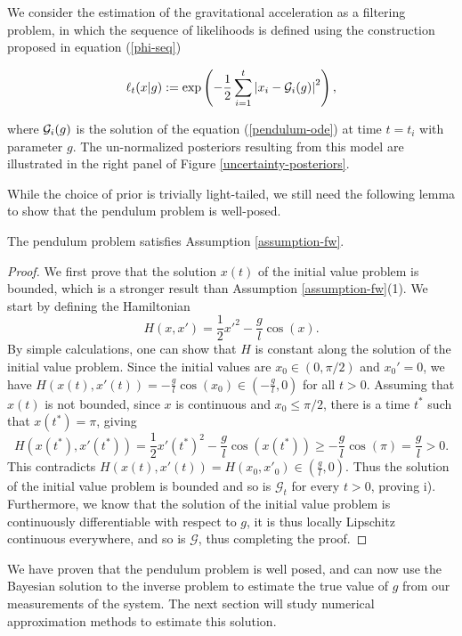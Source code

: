 We consider the estimation of the gravitational acceleration as a filtering problem, in which the sequence of likelihoods is defined using the construction proposed in equation (\ref{phi-seq})

\begin{equation}\label{pendulum-weights}
  \ell_t(x|g) := \exp\left(-\frac12\sum_{i=1}^t\left|x_i - \mathcal{G}_i(g)\right|^2\right),
\end{equation}

where $\mathcal{G}_i(g)$ is the solution of the equation (\ref{pendulum-ode}) at time $t = t_i$ with parameter $g$. The un-normalized posteriors resulting from this model are illustrated in the right panel of Figure \ref{uncertainty-posteriors}.

While the choice of prior is trivially light-tailed, we still need the following lemma to show that the pendulum problem is well-posed.

\begin{lemma} The pendulum problem satisfies Assumption \ref{assumption-fw}.
\end{lemma}

\begin{proof}
  We first prove that the solution $x(t)$ of the initial value problem is bounded, which is a stronger result than Assumption \ref{assumption-fw}(1). We start by defining the Hamiltonian
  \begin{equation*}
    H(x, x') = \frac12 x'^2 - \frac{g}{l}\cos(x).
  \end{equation*}
  By simple calculations, one can show that $H$ is constant along the solution of the initial value problem. Since the initial values are $x_0 \in (0, \pi/2)$ and $x_0' = 0$, we have $H(x(t), x'(t)) = -\frac{g}{l}\cos(x_0) \in (-\frac{g}{l}, 0)$ for all $t > 0$. Assuming that $x(t)$ is not bounded, since $x$ is continuous and $x_0 \le \pi/2$, there is a time $t^*$ such that $x(t^*) = \pi$, giving
  \begin{equation*}
    H(x(t^*), x'(t^*)) = \frac12 x'(t^*)^2 - \frac{g}{l}\cos(x(t^*)) \ge -\frac{g}{l}\cos(\pi) = \frac{g}{l} > 0.
  \end{equation*}
  This contradicts $H(x(t), x'(t)) = H(x_0, x'_0) \in (\frac{g}{l}, 0)$. Thus the solution of the initial value problem is bounded and so is $\mathcal{G}_t$ for every $t > 0$, proving i).
  Furthermore, we know that the solution of the initial value problem is continuously differentiable with respect to $g$, it is thus locally Lipschitz continuous everywhere, and so is $\mathcal{G}$, thus completing the proof.
\end{proof}

We have proven that the pendulum problem is well posed, and can now use the Bayesian solution to the inverse problem to estimate the true value of $g$ from our measurements of the system. The next section will study numerical approximation methods to estimate this solution.

